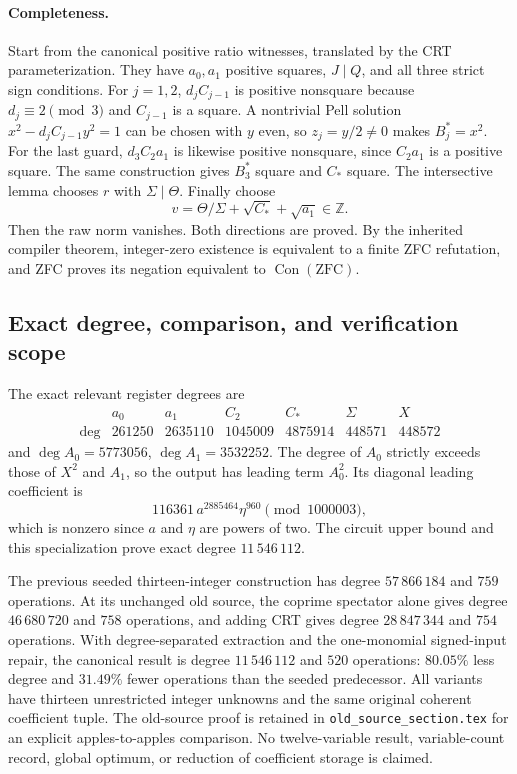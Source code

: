 \paragraph{Completeness.}
Start from the canonical positive ratio witnesses, translated by the CRT
parameterization. They have $a_0,a_1$ positive squares, $J\mid Q$, and all
three strict sign conditions. For $j=1,2$, $d_jC_{j-1}$ is positive
nonsquare because $d_j\equiv2\pmod3$ and $C_{j-1}$ is a square.
A nontrivial Pell solution $x^2-d_jC_{j-1}y^2=1$ can be chosen with $y$
even, so $z_j=y/2\ne0$ makes $B_j^*=x^2$. For the last guard,
$d_3C_2a_1$ is likewise positive nonsquare, since $C_2a_1$ is a positive
square. The same construction gives $B_3^*$ square and $C_*$ square.
The intersective lemma chooses $r$ with $\Sigma\mid\Theta$. Finally choose
\[
 v=\Theta/\Sigma+\sqrt{C_*}+\sqrt{a_1}\in\mathbb Z.
\]
Then the raw norm vanishes. Both directions are proved. By the inherited
compiler theorem, integer-zero existence is equivalent to a finite ZFC
refutation, and ZFC proves its negation equivalent to
$\operatorname{Con}(\mathrm{ZFC})$.

\subsection{Exact degree, comparison, and verification scope}
The exact relevant register degrees are
\[
\begin{array}{c|rrrrrr}
 &a_0&a_1&C_2&C_*&\Sigma&X\\\hline
 \deg&261250&2635110&1045009&4875914&448571&448572
\end{array}
\]
and $\deg A_0=5773056$, $\deg A_1=3532252$. The degree of $A_0$
strictly exceeds those of $X^2$ and $A_1$, so the output has leading term
$A_0^2$. Its diagonal leading coefficient is
\[
 116361\,a^{2885464}\eta^{960}\pmod{1000003},
\]
which is nonzero since $a$ and $\eta$ are powers of two. The circuit upper
bound and this specialization prove exact degree $11\,546\,112$.

The previous seeded thirteen-integer construction has degree $57\,866\,184$
and $759$ operations. At its unchanged old source, the coprime spectator
alone gives degree $46\,680\,720$ and $758$ operations, and adding CRT gives
degree $28\,847\,344$ and $754$ operations. With degree-separated extraction
and the one-monomial signed-input repair, the canonical result is degree
$11\,546\,112$ and $520$ operations: $80.05\%$ less degree and $31.49\%$
fewer operations than the seeded predecessor. All variants have thirteen
unrestricted integer unknowns and the same original coherent coefficient
tuple. The old-source proof is retained in
\texttt{old\_source\_section.tex} for an explicit apples-to-apples comparison.
No twelve-variable result, variable-count record, global optimum, or reduction
of coefficient storage is claimed.


